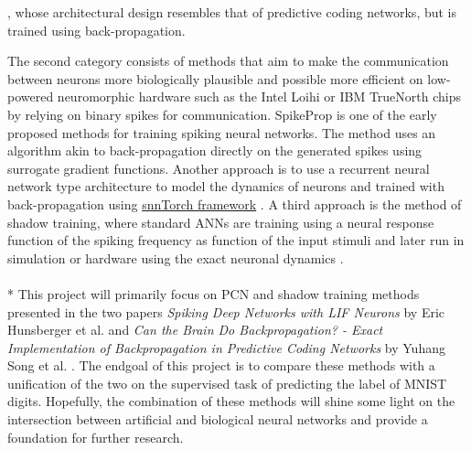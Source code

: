 \documentclass[a4paper,11pt]{article} %
\begin{document}
\cite{lotter-prednet}, whose architectural design resembles that of predictive coding networks, but is trained using back-propagation. 

The second category consists of methods that aim to make the communication between neurons more biologically plausible and possible more efficient on low-powered neuromorphic hardware such as the Intel Loihi or IBM TrueNorth chips by relying on binary spikes for communication. SpikeProp \cite{Boht2000SpikePropBF} is one of the early proposed methods for training spiking neural networks. The method uses an algorithm akin to back-propagation directly on the generated spikes using surrogate gradient functions. Another approach is to use a recurrent neural network type architecture to model the dynamics of neurons and trained with back-propagation using \href{https://snntorch.readthedocs.io/en/latest/}{snnTorch framework} \cite{eshraghian2021training}. A third approach is the method of shadow training, where standard ANNs are training using a neural response function of the spiking frequency as function of the input stimuli and later run in simulation or hardware using the exact neuronal dynamics \cite{hunsberger2015spiking}. \\
\\*
This project will primarily focus on PCN and shadow training methods presented in the two papers \textit{Spiking Deep Networks with LIF Neurons} by Eric Hunsberger et al. \cite{hunsberger2015spiking} and \textit{Can the Brain Do Backpropagation? - Exact Implementation of Backpropagation in Predictive Coding Networks} by Yuhang Song et al. \cite{PredictiveCodingNetworks}. The endgoal of this project is to compare these methods with a unification of the two on the supervised task of predicting the label of MNIST digits. Hopefully, the combination of these methods will shine some light on the intersection between artificial and biological neural networks and provide a foundation for further research.

\newpage
\end{document}
